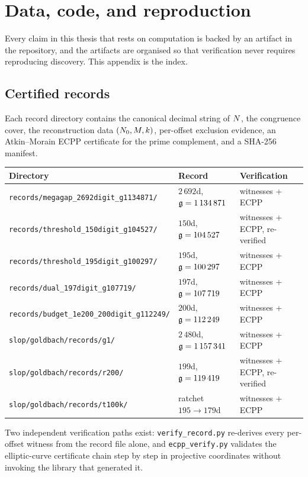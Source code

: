 \chapter{Data, code, and reproduction}\label{app:data}

Every claim in this thesis that rests on computation is backed by an artifact in
the repository, and the artifacts are organised so that verification never
requires reproducing discovery. This appendix is the index.

\section{Certified records}

Each record directory contains the canonical decimal string of $N$, the
congruence cover, the reconstruction data $(N_0,M,k)$, per-offset exclusion
evidence, an Atkin--Morain ECPP certificate for the prime complement, and a
SHA-256 manifest.

\begin{center}\small
\begin{tabular}{lll}
\toprule
Directory & Record & Verification\\
\midrule
\texttt{records/megagap\_2692digit\_g1134871/} & $2\,692$d, $\mathfrak{g}=1\,134\,871$ & witnesses + ECPP\\
\texttt{records/threshold\_150digit\_g104527/} & $150$d, $\mathfrak{g}=104\,527$ & witnesses + ECPP, re-verified\\
\texttt{records/threshold\_195digit\_g100297/} & $195$d, $\mathfrak{g}=100\,297$ & witnesses + ECPP\\
\texttt{records/dual\_197digit\_g107719/} & $197$d, $\mathfrak{g}=107\,719$ & witnesses + ECPP\\
\texttt{records/budget\_1e200\_200digit\_g112249/} & $200$d, $\mathfrak{g}=112\,249$ & witnesses + ECPP\\
\texttt{slop/goldbach/records/g1/} & $2\,480$d, $\mathfrak{g}=1\,157\,341$ & witnesses + ECPP\\
\texttt{slop/goldbach/records/r200/} & $199$d, $\mathfrak{g}=119\,419$ & witnesses + ECPP, re-verified\\
\texttt{slop/goldbach/records/t100k/} & ratchet $195\to179$d & witnesses + ECPP\\
\bottomrule
\end{tabular}
\end{center}

Two independent verification paths exist: \texttt{verify\_record.py}
re-derives every per-offset witness from the record file alone, and
\texttt{ecpp\_verify.py} validates the elliptic-curve certificate chain
step by step in projective coordinates without invoking the library that
generated it.

